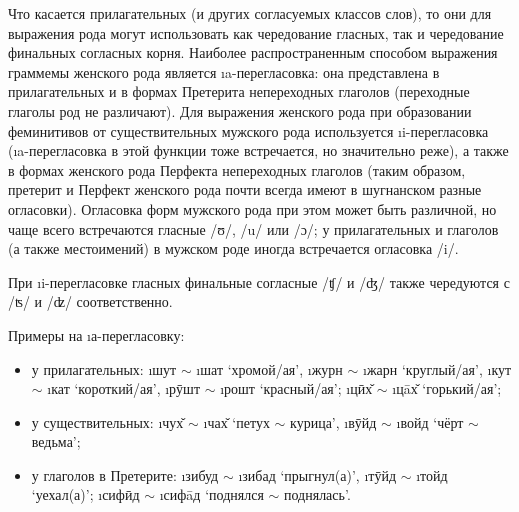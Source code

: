 Что касается прилагательных (и других согласуемых классов слов), то они для выражения рода могут использовать как чередование гласных, так и чередование финальных согласных корня. Наиболее распространенным способом выражения граммемы женского рода является \i{a}-перегласовка: она представлена в прилагательных и в формах Претерита непереходных глаголов (переходные глаголы род не различают). Для выражения женского рода при образовании феминитивов от существительных мужского рода используется \i{i}-перегласовка (\i{a}-перегласовка в этой функции тоже встречается, но значительно реже), а также в формах женского рода Перфекта непереходных глаголов (таким образом, претерит и Перфект женского рода почти всегда имеют в шугнанском разные огласовки). Огласовка форм мужского рода при этом может быть различной, но чаще всего встречаются гласные /ʊ/, /u/ или /ɔ/; у прилагательных и глаголов (а также местоимений) в мужском роде иногда встречается огласовка /i/. 

При \i{i}-перегласовке гласных финальные согласные /ʧ/ и /ʤ/ также чередуются с /ʦ/ и /ʣ/ соответственно.

Примеры на \i{а}-перегласовку:

\begin{itemize}
	\item{у прилагательных: \i{шут} $\sim$ \i{шат} ‘хромой/ая’, \i{журн} $\sim$ \i{жарн} ‘круглый/ая’, \i{кут} $\sim$ \i{кат} ‘короткий/ая’, \i{рӯшт} $\sim$ \i{рошт} ‘красный/ая’; \i{цӣх̌} $\sim$ \i{цāх̌} ‘горький/ая’;}
	\item{у существительных: \i{чух̌} $\sim$ \i{чах̌} ‘петух $\sim$ курица’, \i{вӯйд} $\sim$ \i{войд} ‘чёрт $\sim$ ведьма’;}
	\item{у глаголов в Претерите: \i{зибуд} $\sim$ \i{зибад} ‘прыгнул(а)’, \i{тӯйд} $\sim$ \i{тойд} ‘уехал(а)’; \i{сифӣд} $\sim$ \i{сифāд} ‘поднялся $\sim$ поднялась’.}
\end{itemize}

